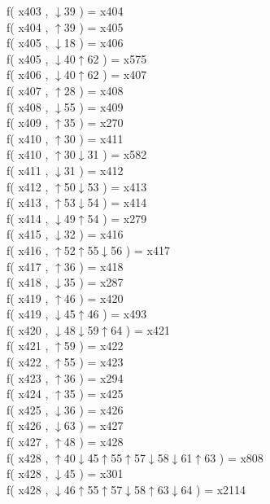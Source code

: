 f( x403 , $\downarrow$39 ) = x404 \\
f( x404 , $\uparrow$39 ) = x405 \\
f( x405 , $\downarrow$18 ) = x406 \\
f( x405 , $\downarrow$40$\uparrow$62 ) = x575 \\
f( x406 , $\downarrow$40$\uparrow$62 ) = x407 \\
f( x407 , $\uparrow$28 ) = x408 \\
f( x408 , $\downarrow$55 ) = x409 \\
f( x409 , $\uparrow$35 ) = x270 \\
f( x410 , $\uparrow$30 ) = x411 \\
f( x410 , $\uparrow$30$\downarrow$31 ) = x582 \\
f( x411 , $\downarrow$31 ) = x412 \\
f( x412 , $\uparrow$50$\downarrow$53 ) = x413 \\
f( x413 , $\uparrow$53$\downarrow$54 ) = x414 \\
f( x414 , $\downarrow$49$\uparrow$54 ) = x279 \\
f( x415 , $\downarrow$32 ) = x416 \\
f( x416 , $\uparrow$52$\uparrow$55$\downarrow$56 ) = x417 \\
f( x417 , $\uparrow$36 ) = x418 \\
f( x418 , $\downarrow$35 ) = x287 \\
f( x419 , $\uparrow$46 ) = x420 \\
f( x419 , $\downarrow$45$\uparrow$46 ) = x493 \\
f( x420 , $\downarrow$48$\downarrow$59$\uparrow$64 ) = x421 \\
f( x421 , $\uparrow$59 ) = x422 \\
f( x422 , $\uparrow$55 ) = x423 \\
f( x423 , $\uparrow$36 ) = x294 \\
f( x424 , $\uparrow$35 ) = x425 \\
f( x425 , $\downarrow$36 ) = x426 \\
f( x426 , $\downarrow$63 ) = x427 \\
f( x427 , $\uparrow$48 ) = x428 \\
f( x428 , $\uparrow$40$\downarrow$45$\uparrow$55$\uparrow$57$\downarrow$58$\downarrow$61$\uparrow$63 ) = x808 \\
f( x428 , $\downarrow$45 ) = x301 \\
f( x428 , $\downarrow$46$\uparrow$55$\uparrow$57$\downarrow$58$\uparrow$63$\downarrow$64 ) = x2114 \\
